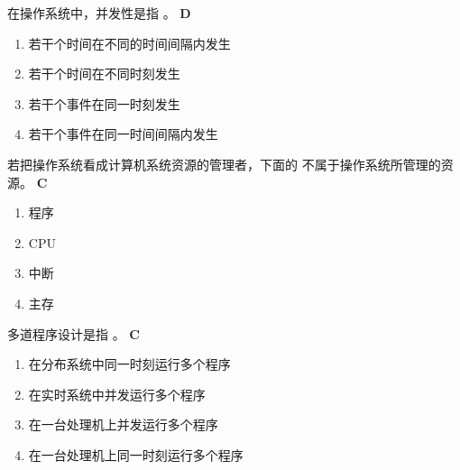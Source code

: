 \begin{problem}
	在操作系统中，并发性是指 \myline。
	\textbf{D}
	\vspace{-0.5em}
	\begin{multicols}{2}
		\begin{enumerate}[label=\Alph*.]
			\item 若干个时间在不同的时间间隔内发生
			\item 若干个时间在不同时刻发生
			\item 若干个事件在同一时刻发生
			\item 若干个事件在同一时间间隔内发生
		\end{enumerate}
	\end{multicols}
	\vspace{-1em}
\end{problem}


\begin{problem}
	若把操作系统看成计算机系统资源的管理者，下面的 \myline 不属于操作系统所管理的资源。
	\textbf{C}
	\vspace{-0.5em}
	\begin{multicols}{4}
		\begin{enumerate}[label=\Alph*.]
			\item 程序
			\item CPU
			\item 中断
			\item 主存
		\end{enumerate}
	\end{multicols}
	\vspace{-1em}
\end{problem}



\begin{problem}
	多道程序设计是指 \myline。   
	\textbf{C}
	\vspace{-0.5em}
	\begin{multicols}{2}
		\begin{enumerate}[label=\Alph*.]
			\item 在分布系统中同一时刻运行多个程序
			\item 在实时系统中并发运行多个程序
			\item 在一台处理机上并发运行多个程序
			\item 在一台处理机上同一时刻运行多个程序
		\end{enumerate}
	\end{multicols}
	\vspace{-1em}
\end{problem}



